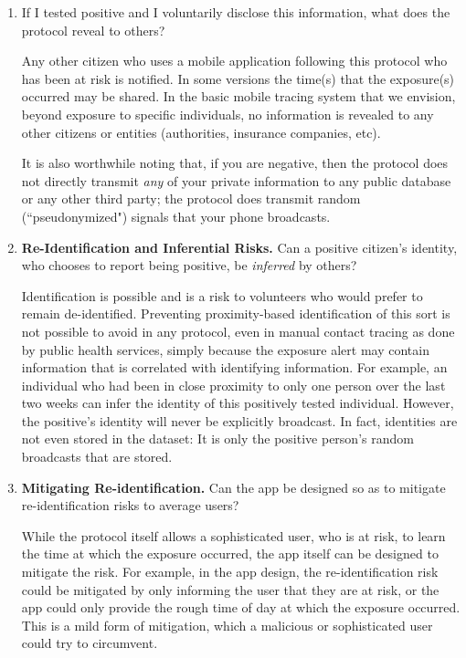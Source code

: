 \documentclass{article}
\begin{document}
\begin{enumerate}[leftmargin=*]
\item If I tested positive and I voluntarily disclose this information, what does the protocol reveal to others?

Any other citizen who uses a mobile application following this protocol who has been at risk is notified. In some versions the time(s) that the exposure(s) occurred may be shared.  In the basic mobile tracing system that we envision, beyond exposure to specific individuals, no information is revealed to any other citizens or entities (authorities, insurance companies, etc). 

It is also worthwhile noting that, if you are negative, then the protocol does not directly transmit \emph{any} of your private information to any public database or any other third party; the protocol does transmit random (``pseudonymized") signals that your phone broadcasts. 

\item \textbf{Re-Identification and Inferential Risks.} Can a positive citizen's identity, who chooses to report being positive, be \emph{inferred} by others? 

Identification is possible and is a risk to volunteers who would prefer to remain de-identified.  Preventing proximity-based identification of this sort is not possible to avoid in any protocol, even in manual contact tracing as done by public health services, simply because the exposure alert may contain information that is correlated with identifying information.
For example, an individual who had been in close proximity to only one person over the last two weeks can infer the identity of this positively tested individual. 
However, the positive's identity will never be explicitly broadcast. In fact, identities are not even stored in the dataset: It is only the positive person's random broadcasts that are stored.

\item \textbf{Mitigating Re-identification.} Can the app be designed so as to mitigate re-identification risks to average users?

While the protocol itself allows a sophisticated user, who is at risk, to learn the time at which the exposure occurred, the app itself can be designed to mitigate the risk. For example, in the app design, the re-identification risk could be mitigated by only informing the user that they are at risk, or the app could only provide the rough time of day at which the exposure occurred.  This is a mild form of mitigation, which a malicious or sophisticated user could try to circumvent.

\end{enumerate}
\end{document}
